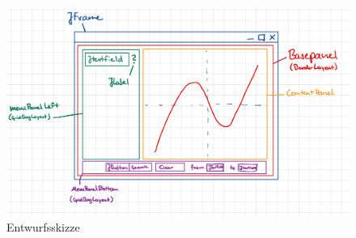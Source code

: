 \documentclass[12pt]{article}
\begin{document}
	\begin{figure}[!ht]
		\begin{center}
			\includegraphics[scale=0.25]{images/sketch.png}
		\end{center}

		\caption{Entwurfsskizze}
	\end{figure}
\end{document}
